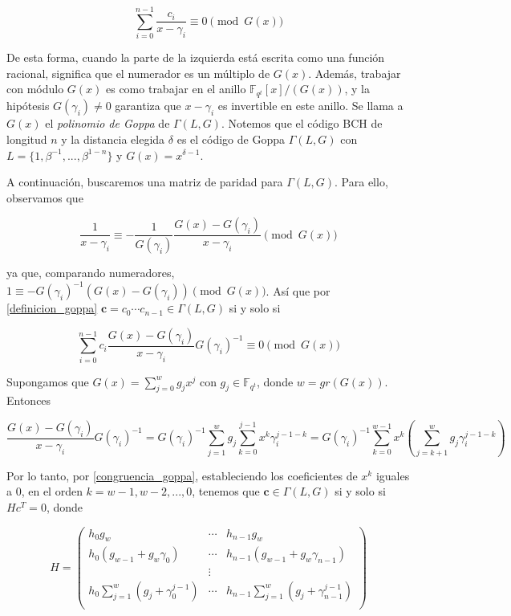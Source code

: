 \begin{equation}
    \label{definicion_goppa}
    \sum_{i=0}^{n-1} \frac{c_i}{x - \gamma_i} \equiv 0 \pmod{G(x)}
\end{equation}

De esta forma, cuando la parte de la izquierda está escrita como una función racional, significa que el numerador es un múltiplo de $G(x)$. Además, trabajar con módulo $G(x)$ es como trabajar en el anillo $\mathbb{F}_{q^t}[x]/(G(x))$, y la hipótesis $G(\gamma_i) \neq 0$ garantiza que $x - \gamma_i$ es invertible en este anillo. Se llama a $G(x)$ el \emph{polinomio de Goppa} de $\Gamma (L,G)$. Notemos que el código BCH de longitud $n$ y la distancia elegida $\delta$ es el código de Goppa $\Gamma (L,G)$ con $L = \{ 1, \beta^{-1}, ..., \beta^{1-n} \}$ y $G(x) = x^{\delta - 1}$.

A continuación, buscaremos una matriz de paridad para $\Gamma (L,G)$. Para ello, observamos que

$$\frac{1}{x - \gamma_i} \equiv - \frac{1}{G(\gamma_i)} \frac{G(x) - G(\gamma_i)}{x - \gamma_i} \pmod{ G(x)}$$

ya que, comparando numeradores, $1 \equiv - G(\gamma_i)^{-1} \left( G(x) - G(\gamma_i) \right) \pmod{G(x)}$. Así que por \eqref{definicion_goppa} $\textbf{c} = c_0 \cdots c_{n-1} \in \Gamma (L,G)$ si y solo si

\begin{equation}
    \label{congruencia_goppa}
    \sum_{i=0}^{n-1} c_i \frac{G(x) - G(\gamma_i)}{x - \gamma_i} G(\gamma_i)^{-1} \equiv 0 \pmod{G(x)}
\end{equation}

Supongamos que $G(x) = \sum_{j=0}^w g_j x^j$ con $g_j \in \mathbb{F}_{q^t}$, donde $w = gr(G(x))$. Entonces

$$\frac{G(x) - G(\gamma_i)}{x - \gamma_i} G(\gamma_i)^{-1} = G(\gamma_i)^{-1} \sum_{j=1}^w g_j \sum_{k=0}^{j-1} x^k \gamma_i^{j-1-k} = G(\gamma_i)^{-1} \sum_{k=0}^{w-1} x^k \left( \sum_{j=k+1}^w g_j \gamma_i^{j-1-k} \right)$$

Por lo tanto, por \eqref{congruencia_goppa}, estableciendo los coeficientes de $x^k$ iguales a $0$, en el orden $k = w - 1, w - 2, ..., 0$, tenemos que $\textbf{c} \in \Gamma (L,G)$ si y solo si $Hc^T = 0$, donde 

\begin{equation}
    H = \left(
        \begin{array}{ccc} 
            h_0 g_w & \cdots & h_{n-1} g_w  \\
            h_0 (g_{w-1} + g_w \gamma_0) & \cdots & h_{n-1} (g_{w-1} + g_w \gamma_{n-1}) \\
            & \vdots & \\
            h_0 \sum_{j=1}^w \left( g_j + \gamma_0^{j-1} \right) & \cdots & h_{n-1} \sum_{j=1}^w \left( g_{j} + \gamma_{n-1}^{j-1} \right) \\
        \end{array}
        \right)
\end{equation}

